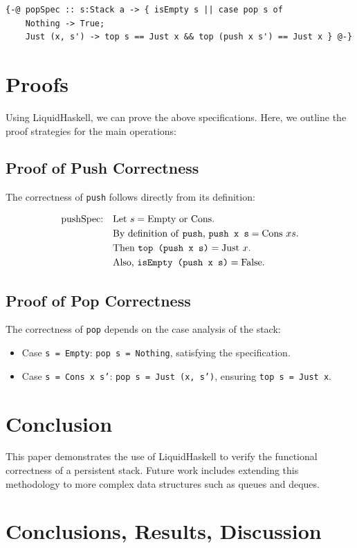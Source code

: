 \documentclass[]{rptuseminar}
\begin{document}
\begin{lstlisting}[caption=Pop Specification]
{-@ popSpec :: s:Stack a -> { isEmpty s || case pop s of
    Nothing -> True;
    Just (x, s') -> top s == Just x && top (push x s') == Just x } @-}
\end{lstlisting}

\section{Proofs}
Using LiquidHaskell, we can prove the above specifications. Here, we outline the proof strategies for the main operations:

\subsection{Proof of Push Correctness}
The correctness of \texttt{push} follows directly from its definition:

\begin{align*}
\text{pushSpec:} \quad & \text{Let } s = \text{Empty or Cons.} \\
& \text{By definition of \texttt{push}, } \texttt{push x s} = \text{Cons } x s. \\
& \text{Then } \texttt{top (push x s)} = \text{Just } x. \\
& \text{Also, } \texttt{isEmpty (push x s)} = \text{False.}
\end{align*}

\subsection{Proof of Pop Correctness}
The correctness of \texttt{pop} depends on the case analysis of the stack:

\begin{itemize}
  \item Case \texttt{s = Empty}: \texttt{pop s = Nothing}, satisfying the specification.
  \item Case \texttt{s = Cons x s'}: \texttt{pop s = Just (x, s')}, ensuring \texttt{top s = Just x}.
\end{itemize}

\section{Conclusion}
This paper demonstrates the use of LiquidHaskell to verify the functional correctness of a persistent stack. Future work includes extending this methodology to more complex data structures such as queues and deques.
\label{sec:example}

\section{Conclusions, Results, Discussion}
\label{sec:conclusions}

\newpage
\nocite{*}



\end{document}
